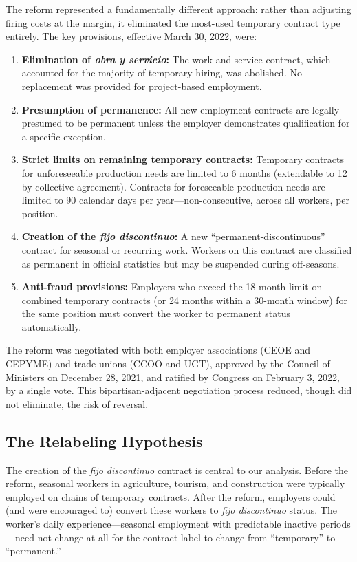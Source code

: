 \documentclass[12pt]{article}
\begin{document}
The reform represented a fundamentally different approach: rather than adjusting firing costs at the margin, it eliminated the most-used temporary contract type entirely. The key provisions, effective March 30, 2022, were:

\begin{enumerate}
\item \textbf{Elimination of \emph{obra y servicio}:} The work-and-service contract, which accounted for the majority of temporary hiring, was abolished. No replacement was provided for project-based employment.

\item \textbf{Presumption of permanence:} All new employment contracts are legally presumed to be permanent unless the employer demonstrates qualification for a specific exception.

\item \textbf{Strict limits on remaining temporary contracts:} Temporary contracts for unforeseeable production needs are limited to 6 months (extendable to 12 by collective agreement). Contracts for foreseeable production needs are limited to 90 calendar days per year---non-consecutive, across all workers, per position.

\item \textbf{Creation of the \emph{fijo discontinuo}:} A new ``permanent-discontinuous'' contract for seasonal or recurring work. Workers on this contract are classified as permanent in official statistics but may be suspended during off-seasons.

\item \textbf{Anti-fraud provisions:} Employers who exceed the 18-month limit on combined temporary contracts (or 24 months within a 30-month window) for the same position must convert the worker to permanent status automatically.
\end{enumerate}

The reform was negotiated with both employer associations (CEOE and CEPYME) and trade unions (CCOO and UGT), approved by the Council of Ministers on December 28, 2021, and ratified by Congress on February 3, 2022, by a single vote. This bipartisan-adjacent negotiation process reduced, though did not eliminate, the risk of reversal.

\subsection{The Relabeling Hypothesis}

The creation of the \emph{fijo discontinuo} contract is central to our analysis. Before the reform, seasonal workers in agriculture, tourism, and construction were typically employed on chains of temporary contracts. After the reform, employers could (and were encouraged to) convert these workers to \emph{fijo discontinuo} status. The worker's daily experience---seasonal employment with predictable inactive periods---need not change at all for the contract label to change from ``temporary'' to ``permanent.''
\end{document}
